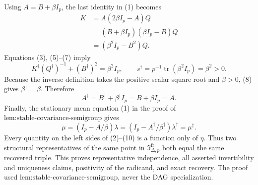 Using \(A=B+\beta I_p\), the last identity in (1) becomes
\[
 \begin{aligned}
 K
 &=A(2\beta I_p-A)Q\\
 &=(B+\beta I_p)(\beta I_p-B)Q\\
 &=(\beta^2I_p-B^2)Q.
 \end{aligned}
\tag{7}
\]
Equations (3), (5)--(7) imply
\[
 K^\dagger(Q^\dagger)^{-1}+(B^\dagger)^2=\beta^2I_p,
\qquad
 s^\dagger=p^{-1}\operatorname{tr}(\beta^2I_p)=\beta^2>0.
\tag{8}
\]
Because the inverse definition takes the positive scalar square root and \(\beta>0\), (8) gives \(\beta^\dagger=\beta\).  Therefore
\[
 A^\dagger=B^\dagger+\beta^\dagger I_p=B+\beta I_p=A.
\tag{9}
\]
Finally, the stationary mean equation (1) in the proof of \(\text{lem:stable-covariance-semigroup}\) gives
\[
 \mu=(I_p-A/\beta)\lambda
 =(I_p-A^\dagger/\beta^\dagger)\lambda^\dagger=\mu^\dagger.
\tag{10}
\]
Every quantity on the left sides of (2)--(10) is a function only of \(\eta\).  Thus two structural representatives of the same point in \(\mathfrak I_{\Delta,p}^{\mathrm{fr}}\) both equal the same recovered triple.  This proves representative independence, all asserted invertibility and uniqueness claims, positivity of the radicand, and exact recovery.  The proof used \(\text{lem:stable-covariance-semigroup}\), never the DAG specialization.
